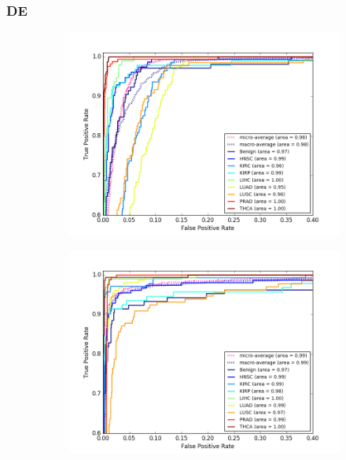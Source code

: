 \subsubsection{DE}

\begin{figure}[H]
     \centering
     \begin{subfigure}[b]{0.49\textwidth}
         \centering
         \includegraphics[width=\textwidth]{img/m_r/de_r_m_dgmu_roc.png}
         \caption{}
     \end{subfigure}
     \hfill
     \begin{subfigure}[b]{0.49\textwidth}
         \centering
         \includegraphics[width=\textwidth]{img/m_r/de_r_m_gmu_roc.png}

\end{subfigure}
\end{figure}
